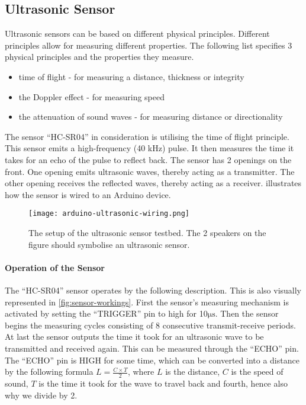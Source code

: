 \subsection{Ultrasonic Sensor}\label{sub:ultrasonic}

Ultrasonic sensors can be based on different physical principles. Different principles allow for measuring different properties. The following list specifies 3 physical principles and the properties they measure.

\begin{itemize}
  \item time of flight - for measuring a distance, thickness or integrity\cite{ultrasound2}
  \item the Doppler effect - for measuring speed\cite{ultrasound}
  \item the attenuation of sound waves - for measuring distance or directionality\cite{ultrasound}
\end{itemize}

The sensor \enquote{HC-SR04} in consideration is utilising the time of flight principle. This sensor emits a high-frequency (40 kHz) pulse. It then measures the time it takes for an echo of the pulse to reflect back. The sensor has 2 openings on the front. One opening emits ultrasonic waves, thereby acting as a transmitter. The other opening receives the reflected waves, thereby acting as a receiver.  illustrates how the sensor is wired to an Arduino device.

\begin{figure}[htbp]
  \centering
  \texttt{[image: arduino-ultrasonic-wiring.png]}
  \caption[The setup of the ultrasonic sensor testbed]{The setup of the ultrasonic sensor testbed. The 2 speakers on the figure should symbolise an ultrasonic sensor.}\label{fig:ultrasonicwiring}
\end{figure}

\paragraph{Operation of the Sensor}
The \enquote{HC-SR04} sensor operates by the following description. This is also visually represented in \cref{fig:sensor-workings}. First the sensor's measuring mechanism is activated by setting the \enquote{TRIGGER} pin to high for 10$\si{\micro\second}$. Then the sensor begins the measuring cycles consisting of 8 consecutive transmit-receive periods. At last the sensor outputs the time it took for an ultrasonic wave to be transmitted and received again. This can be measured through the \enquote{ECHO} pin. The \enquote{ECHO} pin is HIGH for some time, which can be converted into a distance by the following formula $L = \frac{C \times T}{2}$, where $L$ is the distance, $C$ is the speed of sound, $T$ is the time it took for the wave to travel back and fourth, hence also why we divide by 2.

